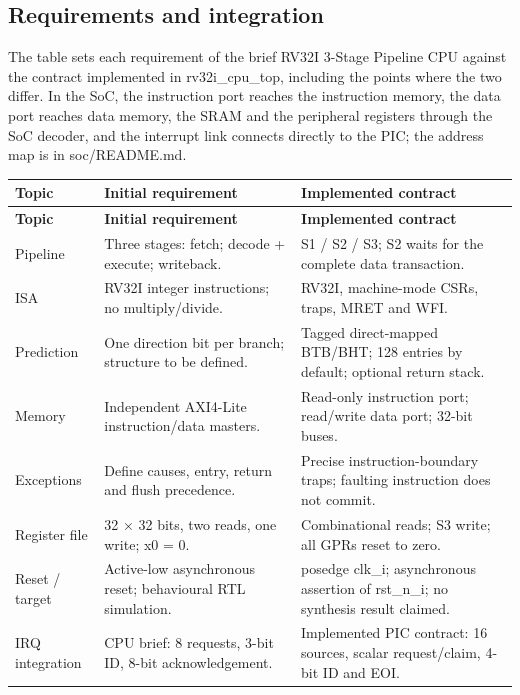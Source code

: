 \documentclass[11pt]{article}
\begin{document}
\subsection{Requirements and integration}
\noindent The table sets each requirement of the brief RV32I 3-Stage Pipeline CPU against the contract implemented in rv32i\_cpu\_top, including the points where the two differ. In the SoC, the instruction port reaches the instruction memory, the data port reaches data memory, the SRAM and the peripheral registers through the SoC decoder, and the interrupt link connects directly to the PIC; the address map is in soc/README.md.\par\medskip
{\small
\begin{longtable}{@{}L{0.1400\dimexpr\linewidth-24pt\relax}L{0.3700\dimexpr\linewidth-24pt\relax}L{0.4900\dimexpr\linewidth-24pt\relax}@{}}
\toprule
\textbf{Topic} & \textbf{Initial requirement} & \textbf{Implemented contract} \\ \midrule
\endfirsthead
\toprule
\textbf{Topic} & \textbf{Initial requirement} & \textbf{Implemented contract} \\ \midrule
\endhead
Pipeline & Three stages: fetch; decode + execute; writeback. & S1 / S2 / S3; S2 waits for the complete data transaction. \\ \addlinespace[3pt]
ISA & RV32I integer instructions; no multiply/divide. & RV32I, machine-mode CSRs, traps, MRET and WFI. \\ \addlinespace[3pt]
Prediction & One direction bit per branch; structure to be defined. & Tagged direct-mapped BTB/BHT; 128 entries by default; optional return stack. \\ \addlinespace[3pt]
Memory & Independent AXI4-Lite instruction/data masters. & Read-only instruction port; read/write data port; 32-bit buses. \\ \addlinespace[3pt]
Exceptions & Define causes, entry, return and flush precedence. & Precise instruction-boundary traps; faulting instruction does not commit. \\ \addlinespace[3pt]
Register file & 32 × 32 bits, two reads, one write; x0 = 0. & Combinational reads; S3 write; all GPRs reset to zero. \\ \addlinespace[3pt]
Reset / target & Active-low asynchronous reset; behavioural RTL simulation. & posedge clk\_i; asynchronous assertion of rst\_n\_i; no synthesis result claimed. \\ \addlinespace[3pt]
IRQ integration & CPU brief: 8 requests, 3-bit ID, 8-bit acknowledgement. & Implemented PIC contract: 16 sources, scalar request/claim, 4-bit ID and EOI. \\*
\bottomrule\end{longtable}}
\end{document}
